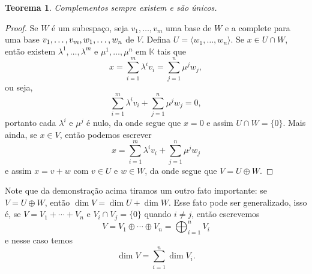 \documentclass{article}
\newtheorem{theorem}[definition]{Teorema}
\begin{document}
\begin{theorem}
    Complementos sempre existem e são únicos.
\end{theorem}
\begin{proof}
    Se $W$ é um subespaço, seja $v_1, \dots, v_m$ uma base de $W$ e a complete para uma base $v_1, \dots, v_m, \\w_1, \dots, w_n$ de $V$. Defina $U = \langle w_1, \dots, w_n \rangle$. Se $x \in U \cap W$, então existem $\lambda^1, \dots, \lambda^m$ e $\mu^1, \dots, \mu^n$ em $\mathbb{K}$ tais que \begin{equation}
        x = \sum_{i = 1}^m \lambda^i v_i = \sum_{j = 1}^n \mu^j w_j,
    \end{equation}
    ou seja, \begin{equation}
        \sum_{i = 1}^m \lambda^i v_i + \sum_{j = 1}^n \mu^j w_j = 0,
    \end{equation} portanto cada $\lambda^i$ e $\mu^j$ é nulo, da onde segue que $x = 0$ e assim $U \cap W = \{0\}$. Mais ainda, se $x \in V$, então podemos escrever \begin{equation}
        x = \sum_{i = 1}^m \lambda^i v_i + \sum_{j = 1}^n \mu^j w_j
    \end{equation} e assim $x = v + w$ com $v \in U$ e $w \in W$, da onde segue que $V = U \oplus W$.
\end{proof}

Note que da demonstração acima tiramos um outro fato importante: se $V = U \oplus W$, então $\dim V = \dim U + \dim W$. Esse fato pode ser generalizado, isso é, se $V = V_1 + \cdots + V_n$ e $V_i \cap V_j = \{0\}$ quando $i \neq j$, então escrevemos \begin{equation}
    V = V_1 \oplus \cdots \oplus V_n = \bigoplus_{i = 1}^n V_i
\end{equation} e nesse caso temos \begin{equation}
    \dim V = \sum_{i = 1}^n \dim V_i.
\end{equation}
\end{document}
